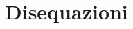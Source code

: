 


% 
%   

% 

\begin{comment}

\begin{inaccessibleblock}[]
\begin{center}
  \
\end{center}
\end{inaccessibleblock}
\end{comment}

\begin{comment}
 
\begin{minipage}{.45\textwidth}
\end{minipage}
\begin{minipage}{.25\textwidth}
\end{minipage}
\begin{minipage}{.3\textwidth}
\end{minipage}
 
\end{comment}

\chapter{Disequazioni}

